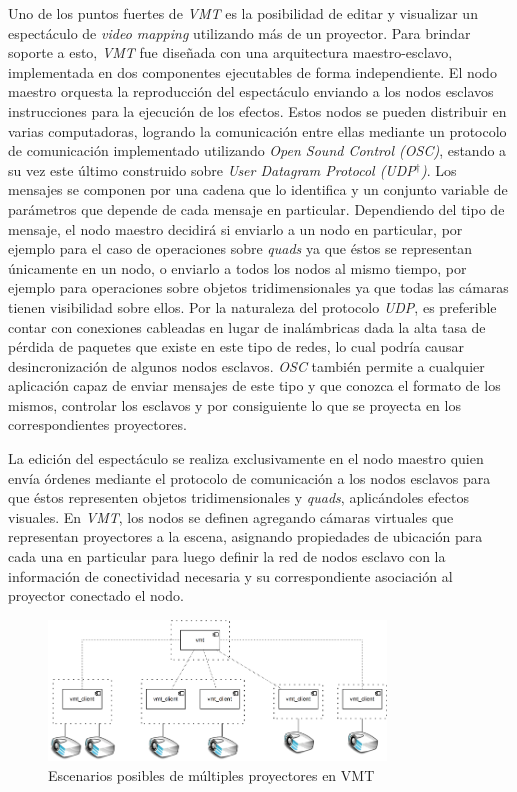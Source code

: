 Uno de los puntos fuertes de \emph{VMT} es la posibilidad de editar y visualizar un espectáculo de \emph{video mapping} utilizando más de un proyector.
Para brindar soporte a esto, \emph{VMT} fue diseñada con una arquitectura maestro-esclavo, implementada en dos componentes ejecutables de forma independiente.
El nodo maestro orquesta la reproducción del espectáculo enviando a los nodos esclavos instrucciones para la ejecución de los efectos. Estos nodos se pueden distribuir en varias computadoras, logrando la comunicación entre ellas mediante un protocolo de comunicación implementado utilizando \emph{Open Sound Control (OSC)}, estando a su vez este último construido sobre \emph{User Datagram Protocol (UDP$^\dagger$)}.
Los mensajes se componen por una cadena que lo identifica y un conjunto variable de parámetros que depende de cada mensaje en particular.
Dependiendo del tipo de mensaje, el nodo maestro decidirá si enviarlo a un nodo en particular, por ejemplo para el caso de operaciones sobre \emph{quads} ya que éstos se representan únicamente en un nodo, o enviarlo a todos los nodos al mismo tiempo, por ejemplo para operaciones sobre objetos tridimensionales ya que todas las cámaras tienen visibilidad sobre ellos.
Por la naturaleza del protocolo \emph{UDP}, es preferible contar con conexiones cableadas en lugar de inalámbricas dada la alta tasa de pérdida de paquetes que existe en este tipo de redes, lo cual podría causar desincronización de algunos nodos esclavos. \emph{OSC} también permite a cualquier aplicación capaz de enviar mensajes de este tipo y que conozca el formato de los mismos, controlar los esclavos y por consiguiente lo que se proyecta en los correspondientes proyectores.

La edición del espectáculo se realiza exclusivamente en el nodo maestro quien envía órdenes mediante el protocolo de comunicación a los nodos esclavos para que éstos representen objetos tridimensionales y \emph{quads}, aplicándoles efectos visuales.
En \emph{VMT}, los nodos se definen agregando cámaras virtuales que representan proyectores a la escena, asignando propiedades de ubicación para cada una en particular para luego definir la red de nodos esclavo con la información de conectividad necesaria y su correspondiente asociación al proyector conectado el nodo.

\begin{figure}[H]
  \centering
    \includegraphics[width=0.8\textwidth]{./Cap5_vmt/vmt_multiProjector.png}
  \caption[Imagen propia.]{Escenarios posibles de múltiples proyectores en VMT}
  \label{fig:VMT-MultiProjector}
\end{figure}

